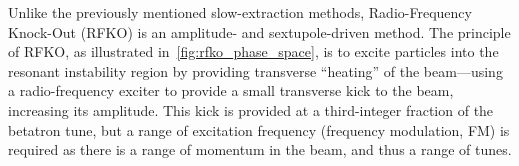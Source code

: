 \documentclass[11pt]{report}
\begin{document}


%

 

Unlike the previously mentioned slow-extraction methods, Radio-Frequency Knock-Out (RFKO) is an amplitude- and sextupole-driven method. The principle of RFKO, as illustrated in~\autoref{fig:rfko_phase_space}, is to excite particles into the resonant instability region by providing transverse ``heating'' of the beam---using a radio-frequency exciter to provide a small transverse kick to the beam, increasing its amplitude. This kick is provided at a third-integer fraction of the betatron tune, but a range of excitation frequency (frequency modulation, FM) is required as there is a range of momentum in the beam, and thus a range of tunes. 
\end{document}
